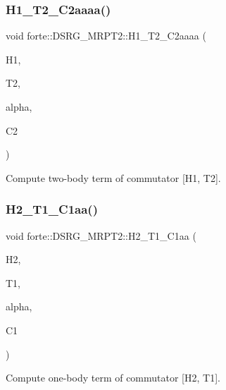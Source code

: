 \subsubsection{\texorpdfstring{H1\+\_\+\+T2\+\_\+\+C2aaaa()}{H1\_T2\_C2aaaa()}}
{\footnotesize\ttfamily void forte\+::\+D\+S\+R\+G\+\_\+\+M\+R\+P\+T2\+::\+H1\+\_\+\+T2\+\_\+\+C2aaaa (\begin{DoxyParamCaption}\item[{Blocked\+Tensor \&}]{H1,  }\item[{Blocked\+Tensor \&}]{T2,  }\item[{const double \&}]{alpha,  }\item[{Blocked\+Tensor \&}]{C2 }\end{DoxyParamCaption})\hspace{0.3cm}{\ttfamily [protected]}}



Compute two-\/body term of commutator \mbox{[}H1, T2\mbox{]}. 

\mbox{\label{classforte_1_1_d_s_r_g___m_r_p_t2_a5736629d09e1cdbded40bfb525757115}} 
\subsubsection{\texorpdfstring{H2\+\_\+\+T1\+\_\+\+C1aa()}{H2\_T1\_C1aa()}}
{\footnotesize\ttfamily void forte\+::\+D\+S\+R\+G\+\_\+\+M\+R\+P\+T2\+::\+H2\+\_\+\+T1\+\_\+\+C1aa (\begin{DoxyParamCaption}\item[{Blocked\+Tensor \&}]{H2,  }\item[{Blocked\+Tensor \&}]{T1,  }\item[{const double \&}]{alpha,  }\item[{Blocked\+Tensor \&}]{C1 }\end{DoxyParamCaption})\hspace{0.3cm}{\ttfamily [protected]}}



Compute one-\/body term of commutator \mbox{[}H2, T1\mbox{]}. 

\mbox{\label{classforte_1_1_d_s_r_g___m_r_p_t2_aa16510df1c5e35c95718f66934c0e755}} 
